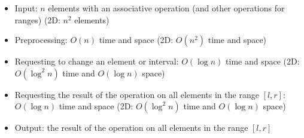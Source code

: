 \begin{itemize}
	\item Input: $n$ elements with an associative operation (and other operations for ranges) (2D: $n^2$ elements)
	\item Preprocessing: $O(n)$ time and space (2D: $O(n^2)$ time and space)
	\item Requesting to change an element or interval: $O(\log{n})$ time and space (2D: $O(\log^2{n})$ time and $O(\log{n})$ space)
	\item Requesting the result of the operation on all elements in the range $[l,r]$: $O(\log{n})$ time and space (2D: $O(\log^2{n})$ time and $O(\log{n})$ space)
	\item Output: the result of the operation on all elements in the range $[l,r]$
\end{itemize}